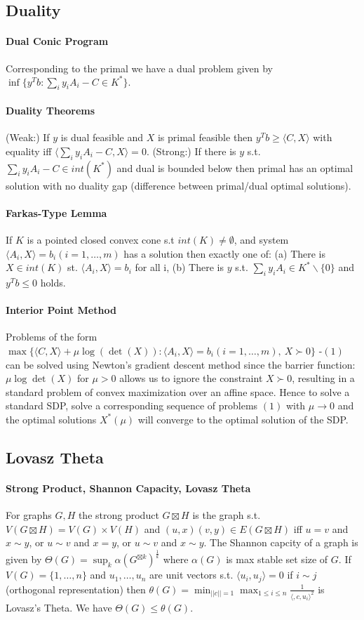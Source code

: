 \documentclass[letterpaper,11pt,oneside,onecolumn]{article}
\begin{document}
\subsection*{Duality}
\paragraph{Dual Conic Program} Corresponding to the primal we have a dual problem given by $\inf \{ y^Tb : \sum_i y_iA_i - C \in K^*\}.$
\paragraph{Duality Theorems} (Weak:) If $y$ is dual feasible and $X$ is primal feasible then $y^Tb \geq \langle C, X\rangle$ with equality iff $\langle \sum_i y_i A_i - C, X\rangle = 0$. (Strong:) If there is $y$ s.t. $\sum_i y_i A_i - C \in int(K^*)$ and dual is bounded below then primal has an optimal solution with no duality gap (difference between primal/dual optimal solutions).
\paragraph{Farkas-Type Lemma} If $K$ is a pointed closed convex cone s.t $int(K) \neq \emptyset$, and system $\langle A_i, X \rangle = b_i (i=1,\dots,m)$ has a solution then exactly one of: (a) There is $X \in int (K)$ st. $\langle A_i, X\rangle = b_i$ for all i, (b) There is $y$ s.t. $\sum_i y_i A_i \in K^*\backslash \{0\}$ and $y^Tb \leq 0$ holds.
\paragraph{Interior Point Method} Problems of the form $\max\{\langle C, X\rangle + \mu \log(\det(X)) : \langle A_i, X\rangle = b_i (i=1,\dots,m),\ X\succ 0 \}$ -$(1)$ can be solved using Newton's gradient descent method since the barrier function: $\mu \log\det(X)$ for $\mu > 0$ allows us to ignore the constraint $X \succ 0$, resulting in a standard problem of convex maximization over an affine space. Hence to solve a standard SDP, solve a corresponding sequence of problems $(1)$ with $\mu \rightarrow 0$ and the optimal solutions $X^*(\mu)$ will converge to the optimal solution of the SDP.
\subsection*{Lovasz Theta}
\paragraph{Strong Product, Shannon Capacity, Lovasz Theta} For graphs $G, H$ the strong product $G \boxtimes H$ is the graph s.t. $V(G\boxtimes H) = V(G) \times V(H)$ and $(u,x)(v,y) \in E(G\boxtimes H)$ iff $u=v$ and $x \sim y$, or $u\sim v$ and $x=y$, or $u\sim v$ and $x\sim y$. The Shannon capcity of a graph is given by $\Theta(G) = \sup_k \alpha(G^{\boxtimes k})^\frac{1}{k}$ where $\alpha(G)$ is max stable set size of $G$. If $V(G) = \{1,\dots, n\}$ and $u_1, \dots, u_n$ are unit vectors s.t. $\langle u_i, u_j\rangle = 0$ if $i \sim j$ (orthogonal representation) then $\theta(G) = \min_{||c|| = 1} \max_{1\leq i \leq n} \frac{1}{\langle, c,u_i\rangle^2}$ is Lovasz's Theta. We have $\Theta(G) \leq \theta (G)$.
\end{document}
